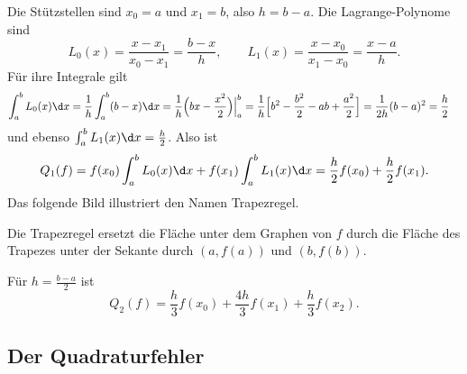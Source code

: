 \documentclass[11pt]{article}
\begin{document}
\begin{example}[Trapezregel, $n = 1$]
  Die Stützstellen sind $x_0 = a$ und $x_1 = b$, also $h = b - a$. Die Lagrange-Polynome sind
  \[ L_0(x) = \frac{x - x_1}{x_0 - x_1} = \frac{b - x}{h}, \qquad L_1(x) = \frac{x - x_0}{x_1 - x_0} = \frac{x - a}{h}. \]
  Für ihre Integrale gilt
  \begin{align*}
    \int_a^b L_0(x) \d x &= \frac{1}{h} \int_a^b (b - x) \d x = \frac{1}{h} \Bigl(bx - \frac{x^2}{2}\Bigr)\Big|_a^b
    = \frac{1}{h} \Bigl[b^2 - \frac{b^2}{2} - ab + \frac{a^2}{2}\Bigr] = \frac{1}{2h} (b - a)^2 = \frac{h}{2}
  \end{align*}
  und ebenso $\int_a^b L_1(x) \d x = \frac{h}{2}$. Also ist
  \[ Q_1(f) = f(x_0) \int_a^b L_0(x) \d x + f(x_1) \int_a^b L_1(x) \d x = \frac{h}{2} f(x_0) + \frac{h}{2} f(x_1). \]
  Das folgende Bild illustriert den Namen \glqq Trapezregel\grqq.
\begin{ergaenzung}
  \begin{center}
  \end{center}
  Die Trapezregel ersetzt die Fläche unter dem Graphen von $f$ durch die Fläche des Trapezes unter der Sekante durch $(a, f(a))$ und $(b, f(b))$.
  \end{ergaenzung}
\end{example}


\begin{example}[Simpson-Regel, $n = 2$]
  Für $h = \frac{b - a}{2}$ ist
  \[ Q_2(f) = \frac{h}{3} f(x_0) + \frac{4h}{3} f(x_1) + \frac{h}{3} f(x_2). \]
\end{example}

\subsection{Der Quadraturfehler}
\end{document}
